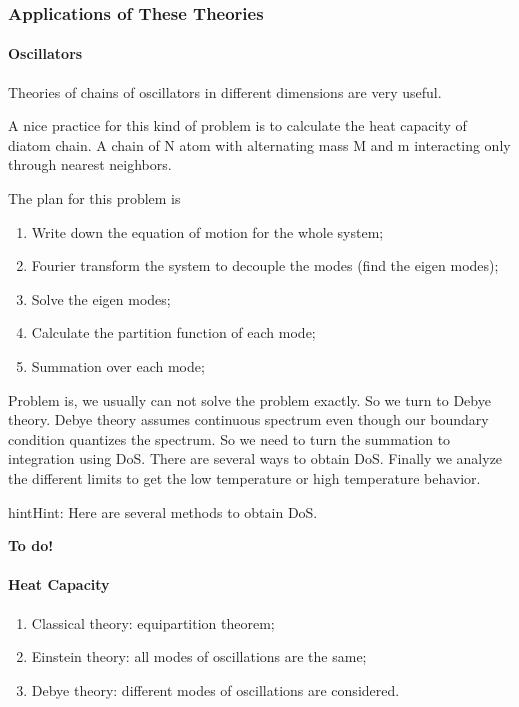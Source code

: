 \documentclass[letterpaper,10pt,english]{sphinxmanual}
\begin{document}
\subsubsection{Applications of These Theories}
\label{equilibrium/summary1:applications-of-these-theories}

\paragraph{Oscillators}
\label{equilibrium/summary1:oscillators}
Theories of chains of oscillators in different dimensions are very useful.

A nice practice for this kind of problem is to calculate the heat capacity of diatom chain. A chain of N atom with alternating mass M and m interacting only through nearest neighbors.

The plan for this problem is
\begin{enumerate}
\item {} 
Write down the equation of motion for the whole system;

\item {} 
Fourier transform the system to decouple the modes (find the eigen modes);

\item {} 
Solve the eigen modes;

\item {} 
Calculate the partition function of each mode;

\item {} 
Summation over each mode;

\end{enumerate}

Problem is, we usually can not solve the problem exactly. So we turn to Debye theory. Debye theory assumes continuous spectrum even though our boundary condition quantizes the spectrum. So we need to turn the summation to integration using DoS. There are several ways to obtain DoS. Finally we analyze the different limits to get the low temperature or high temperature behavior.

\begin{notice}{hint}{Hint:}
Here are several methods to obtain DoS.
\end{notice}

\textbf{To do!}


\paragraph{Heat Capacity}
\label{equilibrium/summary1:heat-capacity}\begin{enumerate}
\item {} 
Classical theory: equipartition theorem;

\item {} 
Einstein theory: all modes of oscillations are the same;

\item {} 
Debye theory: different modes of oscillations are considered.

\end{enumerate}
\end{document}
